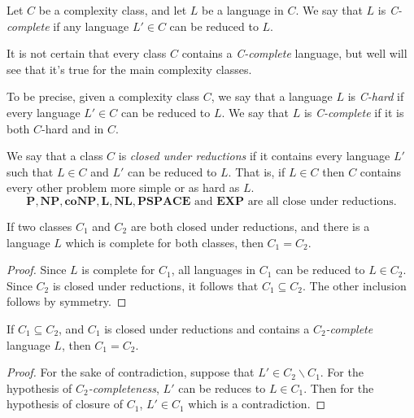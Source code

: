 \documentclass[12pt]{article}
\begin{document}
\begin{defbox}[Completeness]
  Let $C$ be a complexity class, and let $L$ be a language in $C$. We say that $L$ is \emph{C-complete} if any language $L'\in C$ can be reduced to $L$.
\end{defbox}
It is not certain that every class $C$ contains a \emph{C-complete} language, but well will see that it's true for the main complexity classes.
\begin{defbox}[Hardness]
  To be precise, given a complexity class $C$, we say that a language $L$ is \emph{C-hard} if every language $L' \in C$ can be reduced to $L$. We say that $L$ is \emph{C-complete} if it is both $C$-hard and in $C$.
\end{defbox}
\begin{defbox}
  We say that a class $C$ is \emph{closed under reductions} if it contains every language $L'$ such that $L\in C$ and $L'$ can be reduced to $L$. That is, if $L\in C$ then $C$ contains every other problem more simple or as hard as $L$.
  $$\textbf{P},\textbf{NP},\textbf{coNP},\textbf{L},\textbf{NL},\textbf{PSPACE}\text{ and } \textbf{EXP} \text{ are all close under reductions.}$$
\end{defbox}
\begin{defbox}[Proposition]
  If two classes $C_1$ and $C_2$ are both closed under reductions, and there is a language $L$ which is complete for both classes, then $C_1=C_2$.
\end{defbox}
\begin{proof}
  Since $L$ is complete for $C_1$, all languages in $C_1$ can be reduced to $L\in C_2$. Since $C_2$ is closed under reductions, it follows that $C_1\subseteq C_2$. The other inclusion follows by symmetry. 
\end{proof}
\begin{defbox}[Colrollary]
  If $C_1 \subseteq C_2$, and $C_1$ is closed under reductions and contains a \emph{$C_2$-complete} language $L$, then $C_1 = C_2$.
\end{defbox}
\begin{proof}
  For the sake of contradiction, suppose that $L'\in C_2\smallsetminus C_1$. For the hypothesis of \emph{$C_2$-completeness}, $L'$ can be reduces to $L\in C_1$. Then for the hypothesis of closure of $C_1$, $L'\in C_1$ which is a contradiction. 
\end{proof}
\end{document}
